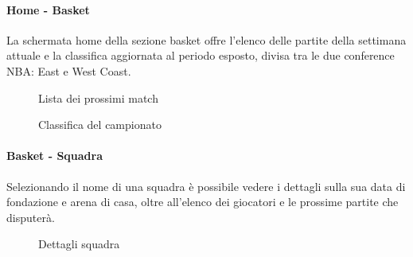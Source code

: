     \paragraph{Home - Basket} La schermata home della sezione basket offre l'elenco delle partite della settimana attuale e la classifica aggiornata al periodo esposto, divisa tra le due conference NBA: East e West Coast. 
    \begin{figure}[H]
        \centering
        \caption{Lista dei prossimi match}
        \label{fig:enter-label}
    \end{figure}
    \begin{figure}[H]
        \centering
        \caption{Classifica del campionato}
        \label{fig:enter-label}
    \end{figure}
    
    \paragraph{Basket - Squadra} Selezionando il nome di una squadra è possibile vedere i dettagli sulla sua data di fondazione e arena di casa, oltre all'elenco dei giocatori e le prossime partite che disputerà.
    \begin{figure}[H]
        \centering
        \caption{Dettagli squadra}
        \label{fig:enter-label}
    \end{figure}
    
